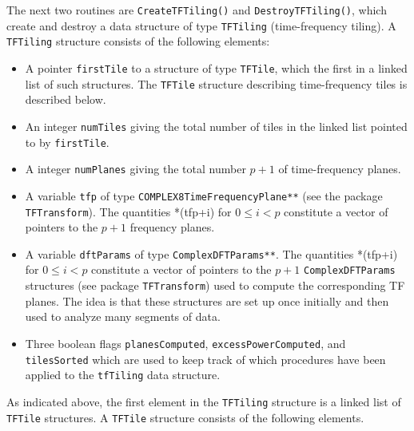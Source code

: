\documentclass{article}
\begin{document}
The next two routines are \verb+CreateTFTiling()+ and
\verb+DestroyTFTiling()+, which create and destroy a data structure of
type \verb+TFTiling+ (time-frequency tiling).  A \verb+TFTiling+
structure consists of the following elements:
\begin{itemize}

\item A pointer \verb+firstTile+ to a structure of type \verb+TFTile+,
which the first in a linked list of such structures.  The
\verb+TFTile+ structure describing time-frequency tiles is described
below.

\item An integer \verb+numTiles+ giving the total number of tiles in
the linked list pointed to by \verb+firstTile+.

\item A integer \verb+numPlanes+ giving the total number $p+1$ of
time-frequency planes.

\item A variable \verb+tfp+ of type 
\verb+COMPLEX8TimeFrequencyPlane**+ (see the package
\verb+TFTransform+).  The quantities *(tfp+i) for $0 \le 
i < p$ constitute a vector of pointers to the $p+1$ frequency planes.

\item A variable \verb+dftParams+ of type 
\verb+ComplexDFTParams**+.  The quantities *(tfp+i) for $0 \le
i < p$ constitute a vector of pointers to the $p+1$ \verb+ComplexDFTParams+
structures (see package \verb+TFTransform+) used to compute the
corresponding TF planes.  The idea is that these structures are set up
once initially and then used to analyze many segments of data.

\item Three boolean flags \verb+planesComputed+,
\verb+excessPowerComputed+, and \verb+tilesSorted+ which are used to
keep track of which procedures have been applied to the
\verb+tfTiling+ data structure.

\end{itemize}



As indicated above, the first element in the \verb+TFTiling+ structure
is a linked list of \verb+TFTile+ structures.  A \verb+TFTile+
structure consists of the following elements.
\end{document}
